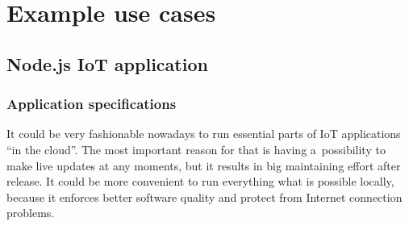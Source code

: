 \documentclass[printmode]{mgr}
\begin{document}



%
%
%
%
%
%
%
%
%
%
%

















\chapter{Example use cases}


\section{Node.js IoT application}

\subsection*{Application specifications}

It could be very fashionable nowadays to run essential parts of IoT applications ``in the cloud''.
The most important reason for that is having a~possibility to make live updates at any moments, but it results in big maintaining effort after release.
It could be more convenient to run everything what is possible locally, because it enforces better software quality and protect from Internet connection problems.
\end{document}

